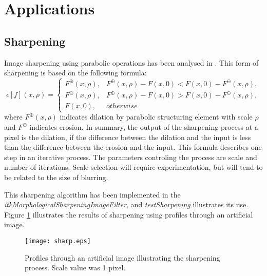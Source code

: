 \documentclass{InsightArticle}
\begin{document}
\section{Applications}
\subsection{Sharpening}
Image sharpening using parabolic operations has been analysed in
\cite{Schavemaker2000}. This form of sharpening is based on the following formula:
\begin{equation}
\epsilon[f](x, \rho) =
\begin{cases}
F^\oplus(x,\rho), &F^\oplus(x,\rho) - F(x,0) < F(x,0) - F^\ominus(x,\rho),\\
F^\ominus(x,\rho), &F^\oplus(x,\rho) - F(x,0) > F(x,0) - F^\ominus(x,\rho),\\
F(x,0), &otherwise
\end{cases}
\end{equation}
where $F^\oplus(x,\rho)$ indicates dilation by parabolic structuring
element with scale $\rho$ and $F^\ominus$ indicates erosion. In
summary, the output of the sharpening process at a pixel is the
dilation, if the difference between the dilation and the input is less
than the difference between the erosion and the input. This formula
describes one step in an iterative process. The parameters controling
the process are scale and number of iterations. Scale selection will
require experimentation, but will tend to be related to the size of
blurring.

This sharpening algorithm has been implemented in the {\em
  itkMorphologicalSharpeningImageFilter}, and {\em testSharpening}
illustrates its use. Figure \ref{fig:sharpprofs} illustrates the
results of sharpening using profiles through an artificial image.

\begin{figure}[htbp]
\centering
\texttt{[image: sharp.eps]}
\caption{Profiles through an artificial image illustrating the sharpening process. Scale value was 1 pixel.\label{fig:sharpprofs}}
\end{figure}
\end{document}

